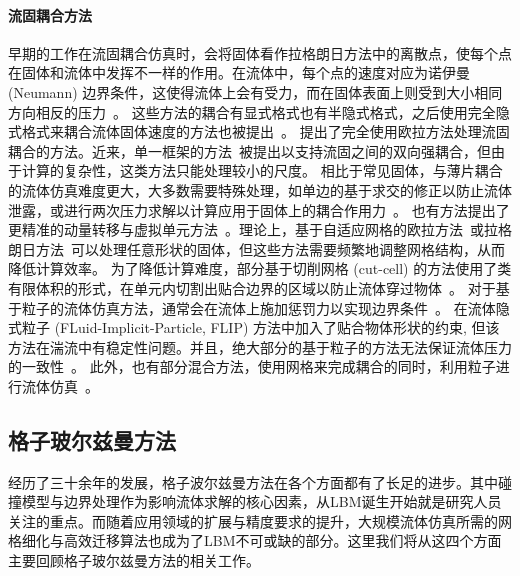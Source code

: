\paragraph{流固耦合方法}
早期的工作在流固耦合仿真时，会将固体看作拉格朗日方法中的离散点，使每个点在固体和流体中发挥不一样的作用。在流体中，每个点的速度对应为诺伊曼 (Neumann) 边界条件，这使得流体上会有受力，而在固体表面上则受到大小相同方向相反的压力~\citep{Carlson-2004,Genevaux-2003,Takahashi-2002,Foster:2001,Yngve:2000}。
这些方法的耦合有显式格式也有半隐式格式，之后使用完全隐式格式来耦合流体固体速度的方法也被提出~\citep{Klingner-2006,Chentanez:2006:SCP,Batty-2007}。\citet{Teng-2016} 提出了完全使用欧拉方法处理流固耦合的方法。近来，单一框架的方法~\citep{takahashi-2020,fang-2020}被提出以支持流固之间的双向强耦合，但由于计算的复杂性，这类方法只能处理较小的尺度。
相比于常见固体，与薄片耦合的流体仿真难度更大，大多数需要特殊处理，如单边的基于求交的修正以防止流体泄露，或进行两次压力求解以计算应用于固体上的耦合作用力~\citep{Guendelman-2005}。
也有方法提出了更精准的动量转移与虚拟单元方法~\citep{Robinson:2009, Robinson-2008}。理论上，基于自适应网格的欧拉方法~\citep{Elcott-2007,Klingner-2006,Feldman:DF:2005,Feldman-2005,dai-2005}或拉格朗日方法~\citep{Clausen-2013,Misztal:2010}可以处理任意形状的固体，但这些方法需要频繁地调整网格结构，从而降低计算效率。
为了降低计算难度，部分基于切削网格 (cut-cell) 的方法使用了类有限体积的形式，在单元内切割出贴合边界的区域以防止流体穿过物体~\citep{Azevedo-2016,Liu:2015:MVF,weber-2015,Edwards-2014,gibou-2012,Ng-2009,Batty-2007,Roble-2005}。
对于基于粒子的流体仿真方法，通常会在流体上施加惩罚力以实现边界条件~\citep{peer-2015,Ihmsen-2014-2}。\citet{Gao:2017} 在流体隐式粒子 (FLuid-Implicit-Particle, FLIP) 方法中加入了贴合物体形状的约束, 但该方法在湍流中有稳定性问题。并且，绝大部分的基于粒子的方法无法保证流体压力的一致性~\citep{band-2018}。
此外，也有部分混合方法，使用网格来完成耦合的同时，利用粒子进行流体仿真~\citep{Fei-2019,Fei-2018,hu-2018,Zhang-2016}。

\subsection{格子玻尔兹曼方法}
经历了三十余年的发展，格子波尔兹曼方法在各个方面都有了长足的进步。其中碰撞模型与边界处理作为影响流体求解的核心因素，从LBM诞生开始就是研究人员关注的重点。而随着应用领域的扩展与精度要求的提升，大规模流体仿真所需的网格细化与高效迁移算法也成为了LBM不可或缺的部分。这里我们将从这四个方面主要回顾格子玻尔兹曼方法的相关工作。
\label{sec:1_related_works_LBM}
